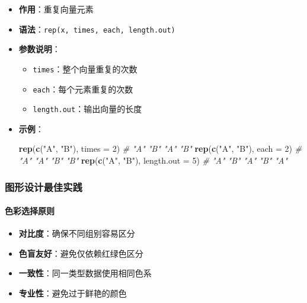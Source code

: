 \documentclass[
]{book}
\newenvironment{Shaded}{\begin{snugshade}}{\end{snugshade}}
\newcommand{\AttributeTok}[1]{\textcolor[rgb]{0.13,0.29,0.53}{#1}}
\newcommand{\CommentTok}[1]{\textcolor[rgb]{0.56,0.35,0.01}{\textit{#1}}}
\newcommand{\DecValTok}[1]{\textcolor[rgb]{0.00,0.00,0.81}{#1}}
\newcommand{\FunctionTok}[1]{\textcolor[rgb]{0.13,0.29,0.53}{\textbf{#1}}}
\newcommand{\NormalTok}[1]{#1}
\newcommand{\StringTok}[1]{\textcolor[rgb]{0.31,0.60,0.02}{#1}}
\providecommand{\tightlist}{%
  \setlength{\itemsep}{0pt}\setlength{\parskip}{0pt}}
\begin{document}
\begin{itemize}
\item
  \textbf{作用}：重复向量元素
\item
  \textbf{语法}：\texttt{rep(x,\ times,\ each,\ length.out)}
\item
  \textbf{参数说明}：

  \begin{itemize}
  \tightlist
  \item
    \texttt{times}：整个向量重复的次数
  \item
    \texttt{each}：每个元素重复的次数
  \item
    \texttt{length.out}：输出向量的长度
  \end{itemize}
\item
  \textbf{示例}：

\begin{Shaded}
\begin{Highlighting}[]
\FunctionTok{rep}\NormalTok{(}\FunctionTok{c}\NormalTok{(}\StringTok{"A"}\NormalTok{, }\StringTok{"B"}\NormalTok{), }\AttributeTok{times =} \DecValTok{2}\NormalTok{)    }\CommentTok{\# "A" "B" "A" "B"}
\FunctionTok{rep}\NormalTok{(}\FunctionTok{c}\NormalTok{(}\StringTok{"A"}\NormalTok{, }\StringTok{"B"}\NormalTok{), }\AttributeTok{each =} \DecValTok{2}\NormalTok{)     }\CommentTok{\# "A" "A" "B" "B"}
\FunctionTok{rep}\NormalTok{(}\FunctionTok{c}\NormalTok{(}\StringTok{"A"}\NormalTok{, }\StringTok{"B"}\NormalTok{), }\AttributeTok{length.out =} \DecValTok{5}\NormalTok{) }\CommentTok{\# "A" "B" "A" "B" "A"}
\end{Highlighting}
\end{Shaded}
\end{itemize}

\hypertarget{ux56feux5f62ux8bbeux8ba1ux6700ux4f73ux5b9eux8df5}{%
\subsubsection{图形设计最佳实践}\label{ux56feux5f62ux8bbeux8ba1ux6700ux4f73ux5b9eux8df5}}

\hypertarget{ux8272ux5f69ux9009ux62e9ux539fux5219}{%
\paragraph{色彩选择原则}\label{ux8272ux5f69ux9009ux62e9ux539fux5219}}

\begin{itemize}
\tightlist
\item
  \textbf{对比度}：确保不同组别容易区分
\item
  \textbf{色盲友好}：避免仅依赖红绿色区分
\item
  \textbf{一致性}：同一类型数据使用相同色系
\item
  \textbf{专业性}：避免过于鲜艳的颜色
\end{itemize}
\end{document}
